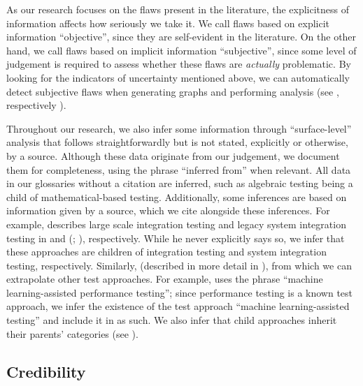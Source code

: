 As our research focuses on the flaws present in the literature, the
explicitness of information affects how seriously we take it. We call flaws
based on explicit information ``objective'', since they are self-evident in
the literature. On the other hand, we call flaws based on implicit information
``subjective'', since some level of judgement is required to assess whether
these flaws are \emph{actually} problematic. By looking for
the indicators of uncertainty mentioned above, we can
automatically detect subjective flaws when generating graphs and performing
analysis (see \ifnotpaper {}, respectively\else
    \fi).

\ifnotpaper
    \label{infers}
    Throughout our research, we also infer some information through
    ``surface-level'' analysis that follows straightforwardly but is not stated,
    explicitly or otherwise, by a source. Although these data originate from
    our judgement, we document them for completeness, using the phrase
    ``inferred from'' when relevant. All data in our glossaries without a
    citation are inferred, such as algebraic testing
    \citep[Fig.~12.2]{PetersAndPedrycz2000} being a child of mathematical-based
    testing. Additionally, some inferences are based on information given by a
    source, which we cite alongside these inferences. For example,
    \citeauthor{Gerrard2000a} describes large scale integration testing and
    legacy system integration testing in \citeyearpar[p.~30]{Gerrard2000b} and
    (\citeyear[Tab.~2]{Gerrard2000a}; \citeyear[Tab.~1]{Gerrard2000b}),
    respectively. While he never explicitly says so, we infer that these
    approaches are children of integration testing and system integration
    testing, respectively. Similarly, \orthTestIntro* (described in
    more detail in ), from which we can extrapolate other test
    approaches. For example, \citet{Moghadam2019} uses the phrase ``machine
    learning-assisted performance testing''; since performance testing is a
    known test approach, we infer the existence of the test approach ``machine
    learning-assisted testing'' and include it in \ourApproachGlossary{} as
    such. We also infer that child approaches inherit their parents' categories
    (see ).
\fi

\subsection{Credibility}\label{cred}

